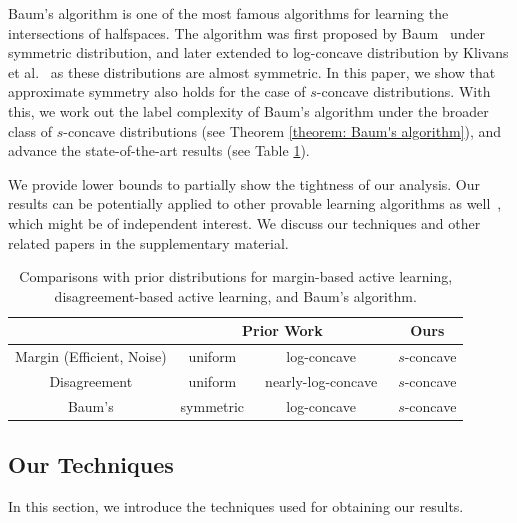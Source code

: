 \documentclass[11pt]{article}
\begin{document}
\medskip
{} Baum's algorithm is one of the most famous algorithms for learning the intersections of halfspaces. The algorithm was first proposed by Baum~\cite{baum1990polynomial} under symmetric distribution, and later extended to log-concave distribution by Klivans et al.~\cite{klivans2009baum} as these distributions are almost symmetric. In this paper, we show that approximate symmetry also holds for the case of $s$-concave distributions. With this, we work out the label complexity of Baum's algorithm under the broader class of $s$-concave distributions (see Theorem \ref{theorem: Baum's algorithm}), and advance the state-of-the-art results (see Table \ref{table: comparisons of distributions}).

We provide lower bounds to partially show the tightness of our analysis. Our results can be potentially applied to other provable learning algorithms as well~\cite{kane2017active,yan2017revisiting,beygelzimer2009importance,xu2017noise,balcan2016noise}, which might be of independent interest. We discuss our techniques and other related papers in the supplementary material.
\begin{table}[t]
\caption{Comparisons with prior distributions for margin-based active learning, disagreement-based active learning, and Baum's algorithm.}
\label{table: comparisons of distributions}
\centering
\begin{tabular}{c|ccc}%
\hline
 & \multicolumn{2}{c}{Prior Work} & Ours\\
\hline
Margin (Efficient, Noise) & uniform~\cite{awasthi2014power} & log-concave~\cite{awasthi2017power} &  $s$-concave\\
Disagreement & uniform~\cite{hanneke2007bound} & nearly-log-concave~\cite{balcan2013active} & $s$-concave\\
Baum's & symmetric~\cite{baum1990polynomial} & log-concave~\cite{klivans2009baum} & $s$-concave\\
\hline
\end{tabular}
\end{table}




\subsection{Our Techniques}

In this section, we introduce the techniques used for obtaining our results.
\end{document}
